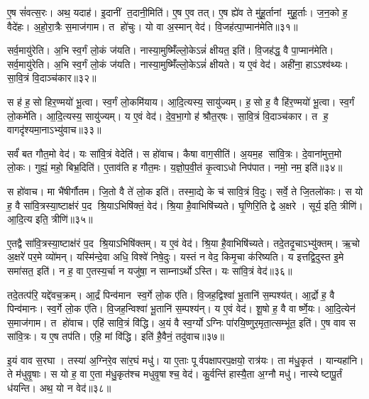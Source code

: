    ए॒ष सं॑वत्स॒रः।
   अथ॒ यदाह॑।
   इ॒दानीं त॒दानी॒मिति॑।
   ए॒ष ए॒व तत्।
   ए॒ष ह्ये॑व ते मु॑हू॒र्तानां मुहू॒र्ताः।
    ज॒न॒को ह॒ वैदे॑हः।
   अ॒हो॒रा॒त्रैः स॒माज॑गाम।
   त हो॑चुः।
   यो वा अ॒स्मान् वेद॑।
   वि॒जह॑त्पा॒प्मान॑मेति॥३१॥

   सर्व॒मायु॑रेति।
   अ॒भि स्व॒र्गं लो॒कं ज॑यति।
   नास्या॒मुष्मिँ॑ल्लो॒के\-ऽन्नं॑ क्षीयत॒ इति॑।
   वि॒जह॑द्ध॒ वै पा॒प्मान॑मेति।
   सर्व॒मायु॑रेति।
   अ॒भि स्व॒र्गं लो॒कं ज॑यति।
   नास्या॒मुष्मिँ॑ल्लो॒केऽन्नं॑ क्षीयते।
   य ए॒वं वेद॑।
   अही॑ना॒ हाऽऽश्व॑थ्यः।
   सा॒वि॒त्रं वि॒दाञ्च॑कार॥३२॥

   स ह॑ ह॒सो हिर॒ण्मयो॑ भू॒त्वा।
   स्व॒र्गं लो॒कमि॑याय।
   आ॒दि॒त्यस्य॒ सायु॑ज्यम्।
   ह॒सो ह॒ वै हि॑र॒ण्मयो॑ भू॒त्वा।
   स्व॒र्गं लो॒कमे॑ति।
   आ॒दि॒त्यस्य॒ सायु॑ज्यम्।
   य ए॒वं वेद॑।
   दे॒व॒भा॒गो ह॑ श्रौत॒र्{‌}षः।
   सा॒वि॒त्रं वि॒दाञ्च॑कार।
   त ह॒ वागदृ॑श्यमा॒नाऽभ्यु॑वाच॥३३॥

   सर्वं॑ बत गौत॒मो वेद॑।
   यः सा॑वि॒त्रं वेदेति॑।
   स हो॑वाच।
   कैषा वाग॒सीति॑।
   अ॒यम॒ह सा॑वि॒त्रः।
   दे॒वाना॑मुत्त॒मो लो॒कः।
   गुह्यं॒ महो॒ बिभ्र॒दिति॑।
   ए॒ताव॑ति ह गौत॒मः।
   य॒ज्ञो॒प॒वी॒तं कृ॒त्वाऽधो निप॑पात।
   नमो॒ नम॒ इति॑॥३४॥

   स हो॑वाच।
   मा भै॑षीर्गौतम।
   जि॒तो वै ते॑ लो॒क इति॑।
   तस्मा॒द्ये के च॑ सावि॒त्रं वि॒दुः।
   सर्वे॒ ते जि॒तलो॑काः।
   स यो ह॒ वै सा॑वि॒त्रस्या॒ष्टाक्ष॑रं प॒द श्रि॒याऽभिषि॑क्तं॒ वेद॑।
   श्रि॒या है॒वाभिषि॑च्यते।
   घृ॒णिरि॒ति द्वे अ॒क्षरे।
   सूर्य॒ इति॒ त्रीणि॑।
   आ॒दि॒त्य इति॒ त्रीणि॑॥३५॥

   ए॒तद्वै सा॑वि॒त्रस्या॒ष्टाक्ष॑रं प॒द श्रि॒याऽभिषि॑क्तम्।
   य ए॒वं वेद॑।
   श्रि॒या है॒वाभिषि॑च्यते।
   तदे॒तदृ॒चाऽभ्यु॑क्तम्।
   ऋ॒चो अ॒क्षरे॑ पर॒मे व्यो॑मन्।
   यस्मि॑न्दे॒वा अधि॒ विश्वे॑ निषे॒दुः।
   यस्तं न वेद॒ किमृ॒चा क॑रिष्यति।
   य इत्तद्वि॒दुस्त इ॒मे समा॑सत॒ इति॑।
   न ह॒ वा ए॒तस्य॒र्चा न यजु॑षा॒ न साम्नाऽर्थोऽस्ति।
   यः सा॑वि॒त्रं वेद॑॥३६॥

   तदे॒तत्प॑रि॒ यद्दे॑वच॒क्रम्।
   आ॒र्द्रं पिन्व॑मान स्व॒र्गे लो॒क ए॑ति।
   वि॒जह॒द्विश्वा॑ भू॒तानि॑ स॒म्पश्य॑त्।
   आ॒र्द्रो ह॒ वै पिन्व॑मानः।
   स्व॒र्गे लो॒क ए॑ति।
   वि॒जह॒न्विश्वा॑ भू॒तानि॑ स॒म्पश्य॑न्।
   य ए॒वं वेद॑।
   शू॒षो ह॒ वै वार्ष्णे॒यः।
   आ॒दि॒त्येन॑ स॒माज॑गाम।
   त हो॑वाच।
   एहि॑ सावि॒त्रं वि॑द्धि।
   अ॒यं वै स्व॒र्ग्योऽग्निः पा॑रयि॒ष्णुर॒मृता॒त्सम्भू॑त॒ इति॑।
   ए॒ष वाव स सा॑वि॒त्रः।
   य ए॒ष तप॑ति।
   एहि॒ मां वि॑द्धि।
   इति॑ है॒वैनं॒ तदु॑वाच॥३७॥
   \anuvakamend

   इ॒यं वाव स॒रघा।
   तस्या॑ अ॒ग्निरे॒व सा॑र॒घं मधु॑।
   या ए॒ताः पूर्वपक्षापरप॒क्षयो॒ रात्र॑यः।
   ता म॑धु॒कृत॑।
   यान्यहा॑नि।
   ते म॑धुवृ॒षाः।
   स यो ह॒ वा ए॒ता म॑धु॒कृत॑श्च मधुवृ॒षाश्च॒ वेद॑।
   कु॒र्वन्ति॑ हास्यै॒ता अ॒ग्नौ मधु॑।
   नास्येष्टापू॒र्तं ध॑यन्ति।
   अथ॒ यो न वेद॑॥३८॥

